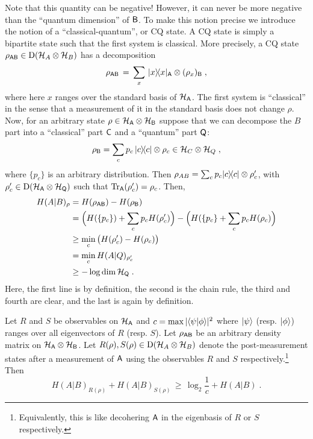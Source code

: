 Note that this quantity can be negative! However, it can never be more negative than the ``quantum dimension'' of ${\textsf{B}}$. To make this notion precise we introduce the notion of a ``classical-quantum'', or CQ state. A CQ state is simply a bipartite state such that the first system is classical. More precisely, a CQ state $\rho_{{\textsf{AB}}} \in \mathrm{D}(\mathcal{H}_A \otimes \mathcal{H}_B)$ has a decomposition
\[ \rho_{{\textsf{AB}}}\,=\, \sum_{x} \,|x\rangle\!\langle x|_{\textsf{A}} \otimes (\rho_x)_{{\textsf{B}}}\;,\]
where here $x$ ranges over the standard basis of $\mathcal{H}_{\textsf{A}}$. The first system is ``classical'' in the sense that a measurement of it in the standard basis does not change $\rho$. Now, for an arbitrary state $\rho \in \mathcal{H}_{\textsf{A}} \otimes \mathcal{H}_{{\textsf{B}}}$ suppose that we can decompose the $B$ part into a ``classical'' part ${\textsf{C}}$ and a ``quantum'' part ${\textsf{Q}}$: 
\[ \rho_{{\textsf{B}}} = \sum_c p_c\,|c\rangle\!\langle c|\otimes \rho_c \in \mathcal{H}_C \otimes \mathcal{H}_Q\;,\]
where $\{p_c\}$ is an arbitrary distribution. Then $\rho_{AB} = \sum_c p_c |c\rangle\!\langle c| \otimes \rho'_c$, with $\rho'_c \in \mathrm{D}(\mathcal{H}_{\textsf{A}} \otimes \mathcal{H}_{{\textsf{Q}}})$ such that $\mbox{\rm Tr}_{{\textsf{A}}}(\rho'_c) = \rho_c$. Then,
\begin{align}
H(A|B)_\rho &= H(\rho_{\textsf{AB}}) - H(\rho_{\textsf{B}})\notag\\
&= \Big(H(\{p_c\}) + \sum_c p_c H(\rho'_c) \Big) - \Big( H(\{p_c\} + \sum_c p_c H(\rho_c)\Big)\notag\\
&\geq \min_c \big( H(\rho'_c) - H(\rho_c) \big)\notag\\
&= \min_c H(A|Q)_{\rho'_c}\notag\\
&\geq -\log\dim \mathcal{H}_{\textsf{Q}}\;.\label{eq:dimq-lb}
\end{align}
Here, the first line is by definition, the second is the chain rule, the third and fourth are clear, and the last is again by definition.



\begin{theorem}\label{thm:uncertainty-quantum}
Let  $R$ and $S$ be observables on $\mathcal{H}_{{\textsf{A}}}$ and $c = \max | \langle\psi| \phi\rangle|^2$ where $|\psi\rangle$ (resp. $|\phi\rangle$) ranges over all eigenvectors of $R$ (resp. $S$). Let $\rho_{{\textsf{AB}}}$ be an arbitrary density matrix on $\mathcal{H}_{\textsf{A}}\otimes \mathcal{H}_{{\textsf{B}}}$. Let $R(\rho), S(\rho)\in \mathrm{D}(\mathcal{H}_A\otimes \mathcal{H}_B)$ denote the post-measurement states after a measurement of ${\textsf{A}}$ using the observables $R$ and $S$ respectively.\footnote{Equivalently, this is like decohering ${\textsf{A}}$ in the eigenbasis of $R$ or $S$ respectively.} Then 
\begin{equation}\label{eq:unc-quantum}
 H(A|B)_{R(\rho)} + H(A|B)_{S(\rho)} \,\geq\, \log_2\frac{1}{c} + H(A|B)\;.
\end{equation}
\end{theorem}


